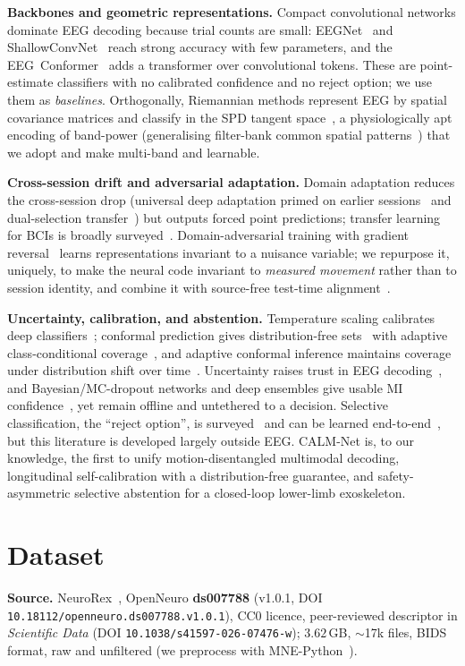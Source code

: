 \documentclass[conference]{IEEEtran}
\begin{document}
\textbf{Backbones and geometric representations.} Compact convolutional networks
dominate EEG decoding because trial counts are small: EEGNet~\cite{lawhern2018} and
ShallowConvNet~\cite{schirrmeister2017} reach strong accuracy with few parameters,
and the EEG~Conformer~\cite{song2023} adds a transformer over convolutional tokens.
These are point-estimate classifiers with no calibrated confidence and no reject
option; we use them as \emph{baselines}. Orthogonally, Riemannian methods represent
EEG by spatial covariance matrices and classify in the SPD tangent
space~\cite{barachant2012, congedo2017, yger2017}, a physiologically apt encoding of
band-power (generalising filter-bank common spatial patterns~\cite{ang2012}) that we
adopt and make multi-band and learnable.

\textbf{Cross-session drift and adversarial adaptation.} Domain adaptation reduces
the cross-session drop (universal deep adaptation primed on earlier
sessions~\cite{zhang2023} and dual-selection transfer~\cite{luo2023}) but outputs
forced point predictions; transfer learning for BCIs is broadly
surveyed~\cite{jayaram2016}. Domain-adversarial training with gradient
reversal~\cite{ganin2016} learns representations invariant to a nuisance variable; we
repurpose it, uniquely, to make the neural code invariant to \emph{measured movement}
rather than to session identity, and combine it with source-free test-time
alignment~\cite{sun2016}.

\textbf{Uncertainty, calibration, and abstention.} Temperature scaling calibrates
deep classifiers~\cite{guo2017}; conformal prediction gives distribution-free
sets~\cite{vovk2005, angelopoulos2023} with adaptive class-conditional
coverage~\cite{romano2020}, and adaptive conformal inference maintains coverage
under distribution shift over time~\cite{gibbs2021}. Uncertainty raises trust in EEG
decoding~\cite{tveter2024}, and Bayesian/MC-dropout networks and deep ensembles give
usable MI confidence~\cite{milanes2023,gal2016,lakshminarayanan2017}, yet remain
offline and untethered to a decision. Selective classification, the ``reject
option'', is surveyed~\cite{hendrickx2024} and can be learned
end-to-end~\cite{geifman2017, geifman2019}, but
this literature is developed largely outside EEG. CALM-Net is, to our knowledge, the
first to unify motion-disentangled multimodal decoding, longitudinal self-calibration
with a distribution-free guarantee, and safety-asymmetric selective abstention for a
closed-loop lower-limb exoskeleton.

\section{Dataset}\label{sec:data}
\textbf{Source.} NeuroRex~\cite{sarkar2026}, OpenNeuro \textbf{ds007788} (v1.0.1, DOI
\texttt{10.18112/openneuro.ds007788.v1.0.1}), CC0 licence, peer-reviewed descriptor
in \emph{Scientific Data} (DOI \texttt{10.1038/s41597-026-07476-w}); $3.62$\,GB,
$\sim$17k files, BIDS format, raw and unfiltered (we preprocess with
MNE-Python~\cite{gramfort2014}).
\end{document}
